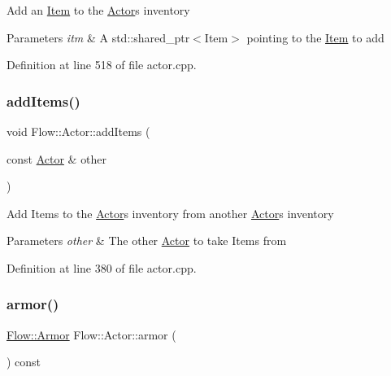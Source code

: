 Add an \hyperlink{class_flow_1_1_item}{Item} to the \hyperlink{class_flow_1_1_actor}{Actor}\textquotesingle{}s inventory 
\begin{DoxyParams}{Parameters}
{\em itm} & A std\+::shared\+\_\+ptr$<$\+Item$>$ pointing to the \hyperlink{class_flow_1_1_item}{Item} to add \\
\hline
\end{DoxyParams}


Definition at line 518 of file actor.\+cpp.

\hypertarget{class_flow_1_1_actor_abf713d204f2cf3fc2de46b32c775ebdc}{}\label{class_flow_1_1_actor_abf713d204f2cf3fc2de46b32c775ebdc} 
\subsubsection{\texorpdfstring{add\+Items()}{addItems()}}
{\footnotesize\ttfamily void Flow\+::\+Actor\+::add\+Items (\begin{DoxyParamCaption}\item[{const \hyperlink{class_flow_1_1_actor}{Actor} \&}]{other }\end{DoxyParamCaption})}

Add Items to the \hyperlink{class_flow_1_1_actor}{Actor}\textquotesingle{}s inventory from another \hyperlink{class_flow_1_1_actor}{Actor}\textquotesingle{}s inventory 
\begin{DoxyParams}{Parameters}
{\em other} & The other \hyperlink{class_flow_1_1_actor}{Actor} to take Items from \\
\hline
\end{DoxyParams}


Definition at line 380 of file actor.\+cpp.

\hypertarget{class_flow_1_1_actor_a2b9ad51f3967a2b738f850440e4e56c0}{}\label{class_flow_1_1_actor_a2b9ad51f3967a2b738f850440e4e56c0} 
\subsubsection{\texorpdfstring{armor()}{armor()}}
{\footnotesize\ttfamily \hyperlink{class_flow_1_1_armor}{Flow\+::\+Armor} Flow\+::\+Actor\+::armor (\begin{DoxyParamCaption}{ }\end{DoxyParamCaption}) const}

